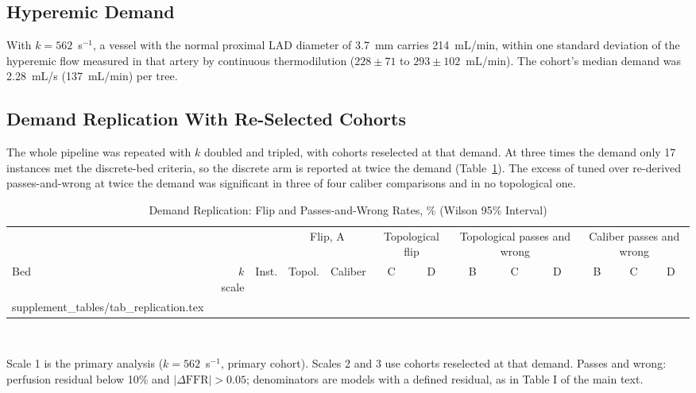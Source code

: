 \documentclass[journal,twoside,web,onecolumn]{ieeecolor}
\begin{document}
\FloatBarrier
{}
\subsection{Hyperemic Demand}\label{sec:demand}
With $k = 562$~s$^{-1}$, a vessel with the normal proximal LAD diameter of 3.7~mm carries 214~mL/min, within one standard deviation of the hyperemic flow measured in that artery by continuous thermodilution ($228 \pm 71$ to $293 \pm 102$~mL/min). The cohort's median demand was 2.28~mL/s (137~mL/min) per tree.


\FloatBarrier
{}
\subsection{Demand Replication With Re-Selected Cohorts}\label{sec:replication}
The whole pipeline was repeated with $k$ doubled and tripled, with cohorts reselected at that demand. At three times
the demand only 17 instances met the discrete-bed criteria, so the discrete arm is reported at twice the demand
(Table~\ref{tab:repl}). The excess of tuned over re-derived passes-and-wrong at twice the demand was significant in
three of four caliber comparisons and in no topological one.
\begin{table}[!ht]
\caption{Demand Replication: Flip and Passes-and-Wrong Rates, \% (Wilson 95\% Interval)}\label{tab:repl}
\centering\footnotesize\setlength{\tabcolsep}{3pt}
\begin{tabular}{@{}lrrcccccccccc@{}}
\toprule
 & & & \multicolumn{2}{c}{Flip, A} & \multicolumn{2}{c}{Topological flip} & \multicolumn{3}{c}{Topological passes and wrong} & \multicolumn{3}{c}{Caliber passes and wrong}\\
\cmidrule(lr){4-5}\cmidrule(lr){6-7}\cmidrule(lr){8-10}\cmidrule(l){11-13}
Bed & $k$ scale & Inst. & Topol. & Caliber & C & D & B & C & D & B & C & D\\
\midrule
{} supplement_tables/tab_replication.tex 
\bottomrule
\end{tabular}
\\[3pt]
\parbox{0.95\textwidth}{\footnotesize Scale 1 is the primary analysis ($k = 562$~s$^{-1}$, primary cohort). Scales 2 and 3 use
cohorts reselected at that demand. Passes and wrong: perfusion residual below 10\% and $|\Delta\mathrm{FFR}| > 0.05$;
denominators are models with a defined residual, as in Table I of the main text.}
\end{table}
\end{document}
